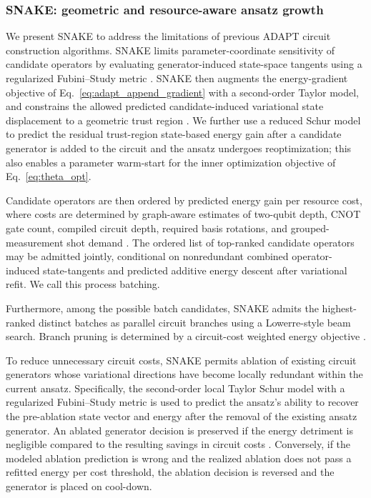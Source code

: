 \documentclass[
  reprint,
  amsmath,
  amssymb,
  aps,
  pra,
  nofootinbib,
  superscriptaddress,
  floatfix
]{revtex4-2}
\begin{document}
\subsubsection{\textsc{SNAKE}: geometric and resource-aware ansatz growth}
We present \textsc{SNAKE} to address the limitations of previous ADAPT circuit construction algorithms. \textsc{SNAKE} limits parameter-coordinate sensitivity of candidate operators by evaluating generator-induced state-space tangents using a regularized Fubini--Study metric \cite{Sohail2026GeoADAPT}. \textsc{SNAKE} then augments the energy-gradient objective of Eq.~\eqref{eq:adapt_append_gradient} with a second-order Taylor model, and constrains the allowed predicted candidate-induced variational state displacement to a geometric trust region \cite{Nocedal2006TrustRegion}. We further use a reduced Schur model to predict the residual trust-region state-based energy gain after a candidate generator is added to the circuit and the ansatz undergoes reoptimization; this also enables a parameter warm-start for the inner optimization objective of Eq.~\eqref{eq:theta_opt}.

Candidate operators are then ordered by predicted energy gain per resource cost, where costs 
are determined by graph-aware estimates of two-qubit depth, CNOT gate count, compiled circuit depth, required basis rotations, and grouped-measurement shot demand \cite{Verteletskyi2020CliqueCover,Yen2020CompatibleMeasurements,Ikhtiarudin2025ShotEfficient}.
The ordered list of top-ranked candidate operators may be admitted jointly, conditional on nonredundant combined operator-induced state-tangents and predicted additive energy descent after variational refit. We call this process batching. 

Furthermore, among the possible batch candidates, \textsc{SNAKE} admits the highest-ranked distinct batches as parallel circuit branches using a Lowerre-style beam search. Branch pruning is determined by a circuit-cost weighted energy objective \cite{Lowerre1976Beam}.


To reduce unnecessary circuit costs, \textsc{SNAKE} permits ablation of existing circuit generators whose variational directions have become locally redundant within the current ansatz. Specifically, the second-order local Taylor Schur model with a regularized Fubini--Study metric is used to predict the ansatz's ability to recover the pre-ablation state vector and energy after the removal of the existing ansatz generator. An ablated generator decision is preserved if the energy detriment is negligible compared to the resulting savings in circuit costs \cite{Vaquero2025PrunedADAPT}. Conversely, if the modeled ablation prediction is wrong and the realized ablation does not pass a refitted energy per cost threshold, the ablation decision is reversed and the generator is placed on cool-down.
\end{document}
